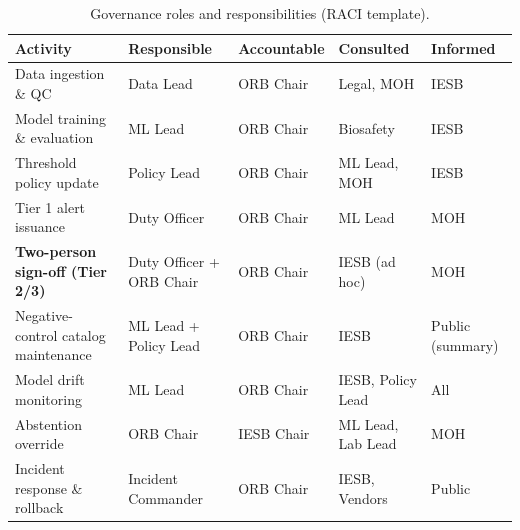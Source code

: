 \documentclass[11pt]{article}
\begin{document}
\begin{table}[H]
\centering
\caption{Governance roles and responsibilities (RACI template).}
\label{tab:raci}
\small
\begin{tabularx}{\textwidth}{>{\raggedright\arraybackslash}p{4.5cm}XXXX}
\toprule
\textbf{Activity} & \textbf{Responsible} & \textbf{Accountable} & \textbf{Consulted} & \textbf{Informed} \\
\midrule
Data ingestion \& QC & Data Lead & ORB Chair & Legal, MOH & IESB \\
Model training \& evaluation & ML Lead & ORB Chair & Biosafety & IESB \\
Threshold policy update & Policy Lead & ORB Chair & ML Lead, MOH & IESB \\
Tier 1 alert issuance & Duty Officer & ORB Chair & ML Lead & MOH \\
\textbf{Two-person sign-off (Tier 2/3)} & Duty Officer + ORB Chair & ORB Chair & IESB (ad hoc) & MOH \\
Negative-control catalog maintenance & ML Lead + Policy Lead & ORB Chair & IESB & Public (summary) \\
Model drift monitoring & ML Lead & ORB Chair & IESB, Policy Lead & All \\
Abstention override\footnotemark & ORB Chair & IESB Chair & ML Lead, Lab Lead & MOH \\
Incident response \& rollback & Incident Commander & ORB Chair & IESB, Vendors & Public \\
\bottomrule
\end{tabularx}
\end{table}
\end{document}
